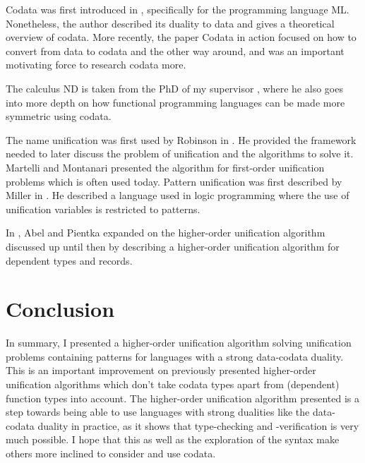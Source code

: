 \documentclass[twoside,12pt,a4paper]{article}
\begin{document}
Codata was first introduced in \cite{HAGINO1989629}, specifically for the programming language ML.
Nonetheless, the author described its duality to data and gives a theoretical overview of codata. %
More recently, the paper Codata in action \cite{10.1007/978-3-030-17184-1_5} 
focused on how to convert from data to codata and the other way around, 
and was an important motivating force to research codata more.

The calculus ND is taken from the PhD of my supervisor \cite{binder2024programming}, 
where he also goes into more depth on how functional programming languages can be made more symmetric using codata.

The name unification was first used by Robinson in \cite{10.1145/321250.321253}. 
He provided the framework needed to later discuss the problem of unification and the algorithms to solve it.
Martelli and Montanari \cite{10.1145/357162.357169} presented the algorithm for first-order unification problems
which is often used today. 
Pattern unification was first described by Miller in \cite{10.1093/logcom/1.4.497}.
He described a language used in logic programming where the use of unification variables is restricted to patterns.

In \cite{10.5555/2021953.2021960}, Abel and Pientka expanded on the higher-order unification algorithm discussed up until then 
by describing a higher-order unification algorithm for dependent types and records.





\section{Conclusion}\label{sec:conclusion}
In summary, I presented a higher-order unification algorithm solving unification problems containing patterns 
for languages with a strong data-codata duality.
This is an important improvement on previously presented higher-order unification algorithms
which don't take codata types apart from (dependent) function types into account. 
The higher-order unification algorithm presented is a step towards 
being able to use languages with strong dualities like the data-codata duality in practice,
as it shows that type-checking and -verification is very much possible.
I hope that this as well as the exploration of the syntax make others more inclined to consider and use codata.
\end{document}
